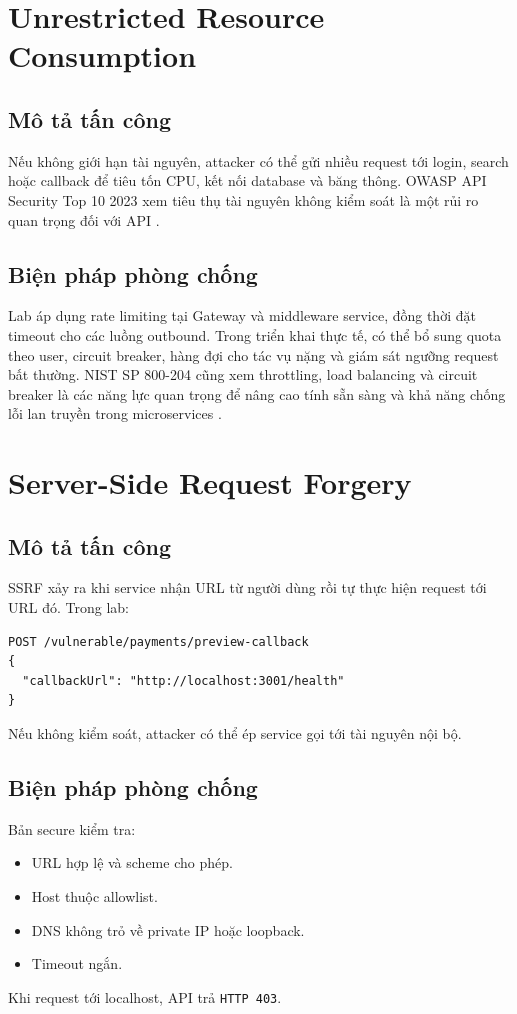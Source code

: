 \documentclass[14pt,a4paper]{extreport}
\begin{document}
\section{Unrestricted Resource Consumption}
\subsection{Mô tả tấn công}
Nếu không giới hạn tài nguyên, attacker có thể gửi nhiều request tới login, search hoặc callback để tiêu tốn CPU, kết nối database và băng thông. OWASP API Security Top 10 2023 xem tiêu thụ tài nguyên không kiểm soát là một rủi ro quan trọng đối với API \cite{owasptop10}.

\subsection{Biện pháp phòng chống}
Lab áp dụng rate limiting tại Gateway và middleware service, đồng thời đặt timeout cho các luồng outbound. Trong triển khai thực tế, có thể bổ sung quota theo user, circuit breaker, hàng đợi cho tác vụ nặng và giám sát ngưỡng request bất thường. NIST SP 800-204 cũng xem throttling, load balancing và circuit breaker là các năng lực quan trọng để nâng cao tính sẵn sàng và khả năng chống lỗi lan truyền trong microservices \cite{nist204}.

\section{Server-Side Request Forgery}
\subsection{Mô tả tấn công}
SSRF xảy ra khi service nhận URL từ người dùng rồi tự thực hiện request tới URL đó. Trong lab:
\begin{lstlisting}
POST /vulnerable/payments/preview-callback
{
  "callbackUrl": "http://localhost:3001/health"
}
\end{lstlisting}
Nếu không kiểm soát, attacker có thể ép service gọi tới tài nguyên nội bộ.

\subsection{Biện pháp phòng chống}
Bản secure kiểm tra:
\begin{itemize}
  \item URL hợp lệ và scheme cho phép.
  \item Host thuộc allowlist.
  \item DNS không trỏ về private IP hoặc loopback.
  \item Timeout ngắn.
\end{itemize}
Khi request tới localhost, API trả \texttt{HTTP 403}.
\end{document}

